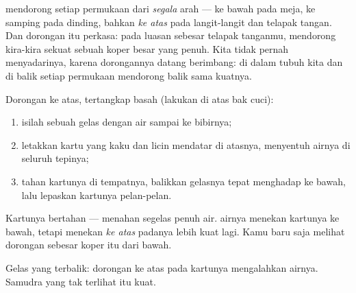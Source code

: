 \begin{proposition}\label{prop:g5:air-pressure-weather:allsides}
 mendorong setiap permukaan dari \emph{segala} arah ---
ke bawah pada meja, ke samping pada dinding, bahkan \emph{ke atas}
pada langit-langit dan telapak tangan. Dan dorongan itu perkasa: pada
luasan sebesar telapak tanganmu,  mendorong kira-kira sekuat
 sebuah koper besar yang penuh. Kita tidak pernah menyadarinya,
karena dorongannya datang berimbang:  di dalam tubuh kita dan di
balik setiap permukaan mendorong balik sama kuatnya.
\end{proposition}

\begin{method}\label{met:g5:air-pressure-weather:card}
Dorongan  ke atas, tertangkap basah (lakukan di atas bak cuci):
\begin{enumerate}
  \item isilah sebuah gelas dengan air sampai ke bibirnya;
  \item letakkan kartu yang kaku dan licin mendatar di atasnya,
        menyentuh airnya di seluruh tepinya;
  \item tahan kartunya di tempatnya, balikkan gelasnya tepat
        menghadap ke bawah, lalu lepaskan kartunya pelan-pelan.
\end{enumerate}
Kartunya bertahan --- menahan segelas penuh air.  airnya menekan
kartunya ke bawah, tetapi  menekan \emph{ke atas} padanya
lebih kuat lagi. Kamu baru saja melihat dorongan sebesar koper itu
dari bawah.
\end{method}

\begin{omfigure}

{\small Gelas yang terbalik: dorongan  ke atas pada kartunya
mengalahkan  airnya. Samudra yang tak terlihat itu kuat.}
\end{omfigure}

